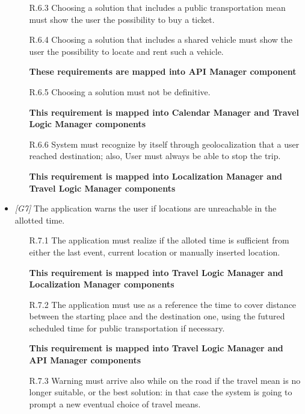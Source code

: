 \begin{itemize}
\begin{itemize}
			\item [R.6.3] Choosing a solution that includes a public transportation mean must show the user the possibility to buy a ticket.

			\item [R.6.4] Choosing a solution that includes a shared vehicle must show the user the possibility to locate and rent such a vehicle.
			
			\textbf{These requirements are mapped into API Manager component}

			\item [R.6.5] Choosing a solution must not be definitive.
			
			\textbf{This requirement is mapped into Calendar Manager and Travel Logic Manager components}

			\item [R.6.6] System must recognize by itself through geolocalization that a user reached destination; also, User must always be able to stop the trip.
			
			\textbf{This requirement is mapped into Localization Manager and Travel Logic Manager components}

		\end{itemize}

                  

                  

	\item \textit{[G7]} The application warns the user if locations are unreachable in the allotted time.

		\begin{itemize}

			\item[R.7.1] The application must realize if the alloted time is sufficient from either the last event, current location or manually inserted location.
			
			\textbf{This requirement is mapped into Travel Logic Manager and Localization Manager components}

			\item[R.7.2] The application must use as a reference the time to cover distance between the starting place and the destination one, using the futured scheduled time for public transportation if necessary.
			
			\textbf{This requirement is mapped into Travel Logic Manager and API Manager components} 

			\item [R.7.3] Warning must arrive also while on the road if the travel mean is no longer suitable, or the best solution: in that case the system is going to prompt a new eventual choice of travel means.
			

\end{itemize}
\end{itemize}
